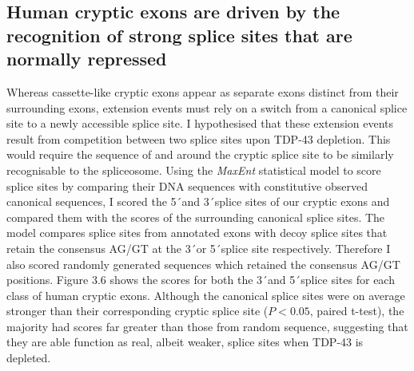 \subsection{Human cryptic exons are driven by the recognition of strong splice sites that are normally repressed}
Whereas cassette-like cryptic exons appear as separate exons distinct from their surrounding exons, extension events must rely on a switch from a canonical splice site to a newly accessible splice site. I hypothesised that these extension events result from competition between two splice sites upon TDP-43 depletion. This would require the sequence of and around the cryptic splice site to be similarly recognisable to the spliceosome. Using the \emph{MaxEnt} statistical model to score splice sites by comparing their DNA sequences with constitutive observed canonical sequences, I scored the 5\'\ and 3\'\ splice sites of our cryptic exons and compared them with the scores of the surrounding canonical splice sites. The model compares splice sites from annotated exons with decoy splice sites that retain the consensus AG/GT at the 3\'\ or 5\'\ splice site respectively. Therefore I also scored randomly generated sequences which retained the consensus AG/GT positions.  Figure 3.6 shows the scores for both the 3\'\ and 5\'\ splice sites for each class of human cryptic exons. Although the canonical splice sites were on average stronger than their corresponding cryptic splice site ($P < 0.05$, paired t-test), the majority had scores far greater than those from random sequence, suggesting that they are able function as real, albeit weaker, splice sites when TDP-43 is depleted.

